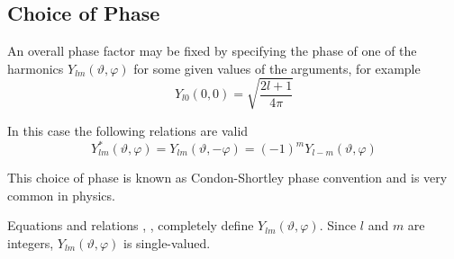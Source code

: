 \subsection{Choice of Phase}
\par{An overall phase factor may be fixed by specifying the phase of one of the
harmonics $Y_{lm}(\vartheta,\varphi)$ for some given values of the arguments,
for example}
\begin{equation}
\label{y00}
Y_{l0}(0,0)=\sqrt{\frac{2l+1}{4\pi}} 
\end{equation}
\par{In this case the following relations are valid}
\begin{equation}
\label{ycomplex}
Y_{lm}^{*}(\vartheta,\varphi)=Y_{lm}(\vartheta,-\varphi)=(-1)^{m}Y_{l-m}(\vartheta,\varphi)
\end{equation}
\par{This choice of phase is known as Condon-Shortley phase convention and is
  very common in physics.}
\par{Equations  and relations , ,
   completely define $Y_{lm}(\vartheta,\varphi)$. Since $l$ and $m$ are integers,
  $Y_{lm}(\vartheta,\varphi)$ is single-valued.}
